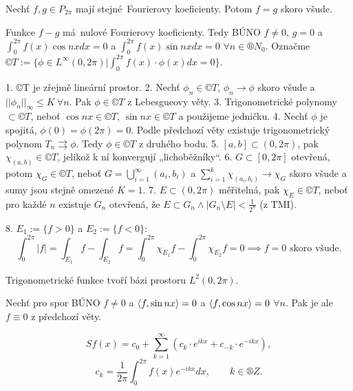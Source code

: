 \documentclass[12pt]{article}					%
\begin{document}
	\begin{veta}
		Nechť $f, g \in P_{2\pi}$ mají stejné Fourierovy koeficienty. Potom $f = g$ skoro všude.

		\begin{dukazin}
			Funkce $f - g$ má nulové Fourierovy koeficienty. Tedy BÚNO $f ≠ 0$, $g = 0$ a $\int_0^{2 \pi} f(x) \cos n x dx = 0$ a $\int_0^{2\pi} f(x) \sin n x dx = 0$ $\forall n \in ®N_0$. Označme $©T := \{\phi \in L^∞ (0, 2\pi) | \int_0^{2\pi} f(x) · \phi(x) dx = 0\}$.

			1. ©T je zřejmě lineární prostor. 2. Nechť $\phi_n \in ©T$, $\phi_n \rightarrow \phi$ skoro všude a $||\phi_n||_∞ ≤ K\ \forall n$. Pak $\phi \in ©T$ z Lebesgueovy věty. 3. Trigonometrické polynomy $\subset ©T$, neboť $\cos n x \in ©T$, $\sin n x \in ©T$ a použijeme jedničku. 4. Nechť $\phi$ je spojitá, $\phi(0) = \phi(2\pi) = 0$. Podle předchozí věty existuje trigonometrický polynom $T_n \rightrightarrows \phi$. Tedy $\phi \in ©T$ z druhého bodu. 5. $[a, b] \subset (0, 2\pi)$, pak $\chi_{(a, b)} \in ©T$, jelikož k ní konvergují „lichoběžníky“. 6. $G \subset [0, 2\pi]$ otevřená, potom $\chi_G \in ©T$, neboť $G = \bigcup_{i=1}^∞ (a_i, b_i)$ a $\sum_{i=1}^k \chi_{(a_i, b_i)} \rightarrow \chi_G$ skoro všude a sumy jsou stejně omezené $K = 1$. 7. $E \subset (0, 2\pi)$ měřitelná, pak $\chi_E \in ©T$, neboť pro každé $n$ existuje $G_n$ otevřená, že $E \subset G_n \land |G_n \setminus E| < \frac{1}{2^n}$ (z TMI).

			8. $E_1 := \{f > 0\}$ a $E_2 := \{f < 0\}$:
			$$ \int_0^{2 \pi} |f| = \int_{E_1} f - \int_{E_2} f = \int_0^{2\pi} \chi_{E_1} f - \int_0^{2\pi} \chi_{E_2} f = 0 \implies f = 0 \text{ skoro všude}. $$
		\end{dukazin}
	\end{veta}

	\begin{dusledek}
		Trigonometrické funkce tvoří bázi prostoru $L^2(0, 2\pi)$.

		\begin{dukazin}
			Nechť pro spor BÚNO $f ≠ 0$ a $\left\langle f, \sin n x\right\rangle = 0$ a $\left\langle f, \cos n x\right\rangle = 0$ $\forall n$. Pak je ale $f ≡ 0$ z předchozí věty.
		\end{dukazin}
	\end{dusledek}

	\begin{poznamka}
		$$ S f(x) = c_0 + \sum_{k=1}^∞ (c_k ·e^{i k x} + c_{-k}·e^{-i k x}), $$
		$$ c_k = \frac{1}{2\pi} \int_0^{2\pi} f(x) e^{-i k x} dx, \qquad k \in ®Z. $$
	\end{poznamka}
\end{document}
